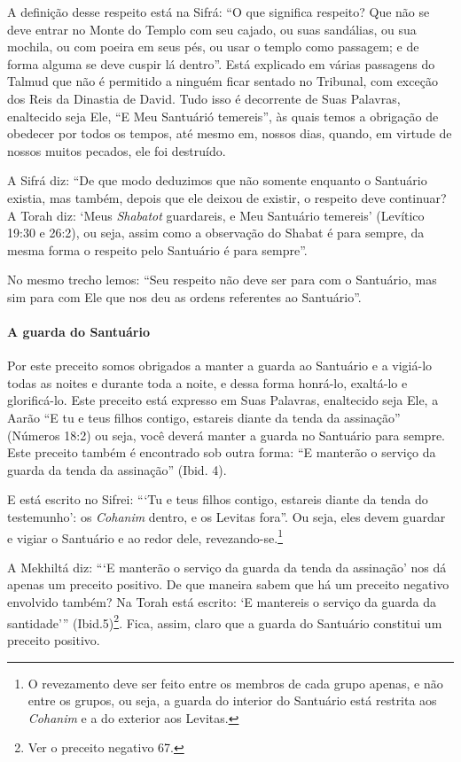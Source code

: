 A definição desse respeito está na Sifrá: ``O que significa respeito?
Que não se deve entrar no Monte do Templo com seu cajado, ou suas
sandálias, ou sua mochila, ou com poeira em seus pés, ou usar o templo
como passagem; e de forma alguma se deve cuspir lá dentro''. Está
explicado em várias passagens do Talmud que não é permitido a ninguém
ficar sentado no Tribunal, com exceção dos Reis da Dinastia de David.
Tudo isso é decorrente de Suas Palavras, enaltecido seja Ele, ``E Meu
Santuárió temereis'', às quais temos a obrigação de obedecer por todos
os tempos, até mesmo em, nossos dias, quando, em virtude de nossos
muitos pecados, ele foi destruído.

A Sifrá diz: ``De que modo deduzimos que não somente enquanto o
Santuário existia, mas também, depois que ele deixou de existir, o
respeito deve continuar? A Torah diz: `Meus \emph{Shabatot} guardareis,
e Meu Santuário temereis' (Levítico 19:30 e 26:2), ou seja, assim como a observação do
Shabat é para sempre, da mesma forma o respeito pelo Santuário é para
sempre''.

No mesmo trecho lemos: ``Seu respeito não deve ser para com o Santuário,
mas sim para com Ele que nos deu as ordens referentes ao Santuário''.

\paragraph{A guarda do Santuário}

Por este preceito somos obrigados a manter a guarda ao Santuário e a
vigiá-lo todas as noites e durante toda a noite, e dessa forma honrá-lo,
exaltá-lo e glorificá-lo. Este preceito está expresso em Suas Palavras,
enaltecido seja Ele, a Aarão ``E tu e teus filhos contigo, estareis
diante da tenda da assinação'' (Números 18:2) ou seja, você deverá
manter a guarda no Santuário para sempre. Este preceito também é
encontrado sob outra forma: ``E manterão o serviço da guarda da tenda da
assinação'' (Ibid. 4).


E está escrito no Sifrei: ```Tu e teus filhos contigo, estareis diante
da tenda do testemunho': os \textit{Cohanim} dentro, e os Levitas fora''. Ou
seja, eles devem guardar e vigiar o Santuário e ao redor dele,
revezando-se.\footnote{O revezamento deve ser feito entre os membros de cada grupo apenas, e
  não entre os grupos, ou seja, a guarda do interior do Santuário está
  restrita aos \textit{Cohanim} e a do exterior aos Levitas.}

A Mekhiltá diz: ```E manterão o serviço da guarda da tenda da assinação'
nos dá apenas um preceito positivo. De que maneira sabem que há um
preceito negativo envolvido também? Na Torah está escrito: `E mantereis
o serviço da guarda da santidade''' (Ibid.5)\footnote{Ver o preceito negativo 67.}. Fica, assim, claro que a guarda do Santuário constitui um preceito positivo.

